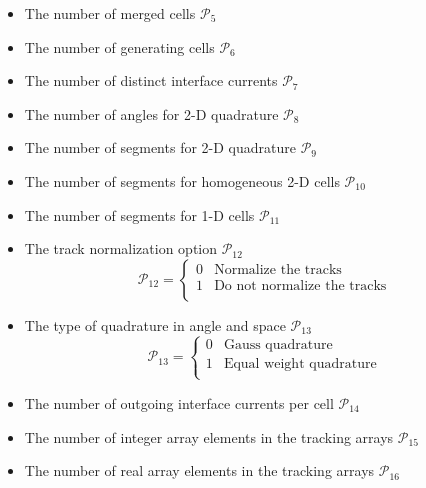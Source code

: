 \begin{itemize}
\item The number of merged cells $\mathcal{P}_{5}$

\item The number of generating cells $\mathcal{P}_{6}$

\item The number of distinct interface currents $\mathcal{P}_{7}$

\item The number of angles for 2-D quadrature $\mathcal{P}_{8}$

\item The number of segments for 2-D quadrature $\mathcal{P}_{9}$

\item The number of segments for homogeneous 2-D cells $\mathcal{P}_{10}$

\item The number of segments for 1-D cells $\mathcal{P}_{11}$

\item The track normalization option $\mathcal{P}_{12}$
\begin{displaymath}
\mathcal{P}_{12} = \left\{
\begin{array}{rl}
 0 & \textrm{Normalize the tracks} \\
 1 & \textrm{Do not normalize the tracks} \\
\end{array} \right.
\end{displaymath}

\item The type of quadrature in angle and space $\mathcal{P}_{13}$
\begin{displaymath}
\mathcal{P}_{13} = \left\{
\begin{array}{rl}
 0 & \textrm{Gauss quadrature} \\
 1 & \textrm{Equal weight quadrature} \\
\end{array} \right.
\end{displaymath}

\item The number of outgoing interface currents per cell $\mathcal{P}_{14}$

\item The number of integer array elements in the tracking arrays $\mathcal{P}_{15}$

\item The number of real array elements in the tracking arrays $\mathcal{P}_{16}$

\end{itemize}

\eject
